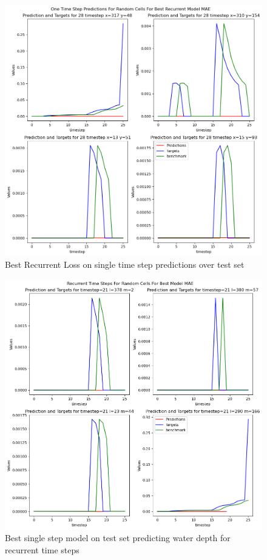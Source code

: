 \begin{figure}[tbph]
	\centering
	\includegraphics[width=0.8\linewidth, height=0.3\textheight]{Figures/Results/Final_Results/Best_Model_recurrentMAE_SS_random_cell}
	\caption[Best Recurrent Loss on single time step predictions over test set]{Best Recurrent Loss on single time step predictions over test set}
	\label{fig:BRMS}
\end{figure}


\begin{figure}[tbph]
	\centering
	\includegraphics[width=0.8\linewidth, height=0.3\textheight]{Figures/Results/Final_Results/Best_Model_SS_recurrent_random_cell}
	\caption[Best single step model on test set predicting water depth for recurrent time steps]{Best single step model on test set predicting water depth for recurrent time steps}
	\label{fig:BSMR}
\end{figure}

